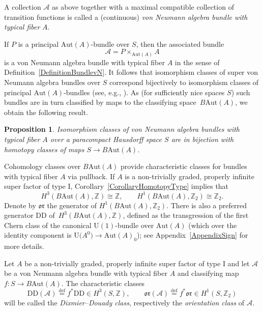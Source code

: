 \documentclass[pdftex]{sigma}
\numberwithin{equation}{section}
\newtheorem{Proposition}[Theorem]{Proposition}
\newcommand{\Z}{\mathbb{Z}}
\newcommand{\A}{\mathcal{A}}
\newcommand{\Aut}{\mathrm{Aut}}
\newcommand{\U}{\mathrm{U}}
\newcommand{\DD}{\mathrm{DD}}
\newcommand{\defeq}{\stackrel{\mathrm{def}}{=}}
\newcommand{\oclass}{\mathfrak{or}}
\begin{document}
\begin{Definition} \label{DefinitionBundlevN}
A collection $\A$ as above together with a maximal compatible collection of transition functions is called a (continuous) \emph{von Neumann algebra bundle with typical fiber} $A$.
\end{Definition}

If $P$ is a principal $\Aut(A)$-bundle over $S$, then the associated bundle
\begin{equation*}
\A = P \times_{\Aut(A)} A
\end{equation*}
 is a von Neumann algebra bundle with typical fiber $A$ in the sense of Definition~\ref{DefinitionBundlevN}.
It follows that isomorphism classes of super von Neumann algebra bundles over $S$ %
correspond bijectively to isomorphism classes of principal $\Aut(A)$-bundles (see, e.g., \cite[Section~4]{PennigWStarBundles}).
As (for sufficiently nice spaces $S$) such bundles are in turn classified by maps to the classifying space~$B\Aut(A)$, we obtain the following result.

\begin{Proposition} \label{PropositionClassifyingWStar}
 Isomorphism classes of von Neumann algebra bundles with typical fiber $A$ over a paracompact Hausdorff space $S$ are in bijection with homotopy classes of maps $S \to B\Aut(A)$.
\end{Proposition}

Cohomology classes over $B\Aut(A)$ provide characteristic classes for bundles with typical fiber $A$ via pullback.
If $A$ is a non-trivially graded, properly infinite super factor of type I,
Corollary~\ref{CorollaryHomotopyType} implies that
\begin{equation*}
 H^3(B\Aut(A), \Z) \cong \Z, \qquad H^1(B\Aut(A), \Z_2) \cong \Z_2.
\end{equation*}
Denote by $\oclass$ the generator of $H^1(B\Aut(A), \Z_2)$.
There is also a preferred generator $\DD$ of~$H^3(B\Aut(A), \Z)$, defined as the transgression of the first Chern class of the canonical $\U(1)$-bundle over $\Aut(A)$ (which over the identity component is $\U\big(A^0\big) \to \Aut(A)_0$);
see Appendix~\ref{AppendixSign} for more details.

\begin{Definition} \label{DefinitionCharacteristicClasses}
Let $A$ be a non-trivially graded, properly infinite super factor of type I and let $\A$ be a von Neumann algebra bundle with typical fiber $A$ and classifying map $f\colon S \to B\Aut(A)$.
The characteristic classes
\begin{equation*}
 \DD(\A) \defeq f^* \DD \in H^3(S, \Z), \qquad \oclass(\A) \defeq f^*\oclass \in H^1(S, \Z_2)
\end{equation*}
will be called the \emph{Dixmier--Douady class}, respectively the \emph{orientation class} of $\mathcal{A}$.
\end{Definition}
\end{document}
